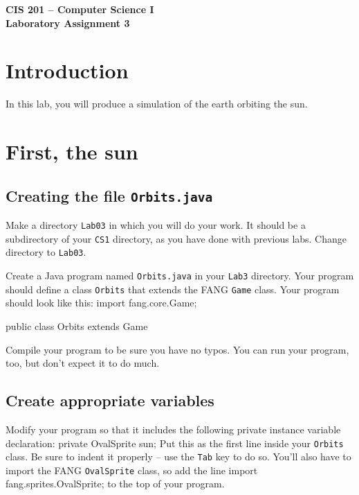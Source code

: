 \documentclass[11pt]{article}
\newenvironment{qv}%
  {\quote
   \verbatim}%
  {\endverbatim
   \endquote}
\begin{document}
\vspace*{0.5in}
\begin{center}
\Large\bf
CIS 201 -- Computer Science I\\
Laboratory Assignment 3\\
\end{center}

\section*{Introduction}
In this lab, you will produce a simulation of the earth orbiting the sun.

\section*{First, the sun}

\subsection*{Creating the file {\tt Orbits.java}}
Make a directory {\tt Lab03} in which you will do your work.
It should be a subdirectory of your {\tt CS1} directory,
as you have done with previous labs.
Change directory to {\tt Lab03}.

Create a Java program named {\tt Orbits.java} in your {\tt Lab3} directory.
Your program should define a class {\tt Orbits}
that extends the FANG {\tt Game} class.
Your program should look like this:
\begin{qv}
import fang.core.Game;

public class Orbits extends Game {

}
\end{qv}

Compile your program to be sure you have no typos.
You can run your program, too, but don't expect it to do much.

\subsection*{Create appropriate variables}
Modify your program so that it includes
the following private instance variable declaration:
\begin{qv}
private OvalSprite sun;
\end{qv}
Put this as the first line inside your \verb'Orbits' class.
Be sure to indent it properly -- use the \verb'Tab' key to do so.
You'll also have to import the FANG \verb'OvalSprite' class,
so add the line
\begin{qv}
import fang.sprites.OvalSprite;
\end{qv}
to the top of your program.
\end{document}
